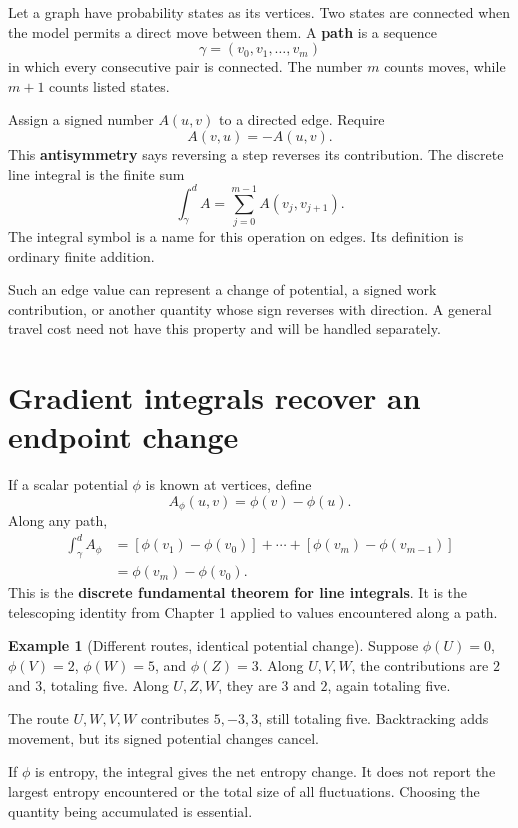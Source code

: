 \documentclass[11pt,oneside,openany]{book}
\theoremstyle{definition}
\newtheorem{example}{Example}[chapter]
\theoremstyle{remark}
\numberwithin{equation}{chapter}
\begin{document}
Let a graph have probability states as its vertices. Two states are connected when the model permits a direct move between them. A \textbf{path} is a sequence \[\gamma=(v_0,v_1,\ldots,v_m)\] in which every consecutive pair is connected. The number \(m\) counts moves, while \(m+1\) counts listed states.

Assign a signed number \(A(u,v)\) to a directed edge. Require \[A(v,u)=-A(u,v).\] This \textbf{antisymmetry} says reversing a step reverses its contribution. The discrete line integral is the finite sum \[\boxed{\int_\gamma^d A=\sum_{j=0}^{m-1}A(v_j,v_{j+1}).}\] The integral symbol is a name for this operation on edges. Its definition is ordinary finite addition.

Such an edge value can represent a change of potential, a signed work contribution, or another quantity whose sign reverses with direction. A general travel cost need not have this property and will be handled separately.

\section{Gradient integrals recover an endpoint change}\label{ch08-gradient-integrals-recover-an-endpoint-change}

If a scalar potential \(\phi\) is known at vertices, define \[A_\phi(u,v)=\phi(v)-\phi(u).\] Along any path, \[\begin{aligned}
\int_\gamma^d A_\phi
&=[\phi(v_1)-\phi(v_0)]+\cdots+[\phi(v_m)-\phi(v_{m-1})]\\
&=\phi(v_m)-\phi(v_0).
\end{aligned}\] This is the \textbf{discrete fundamental theorem for line integrals}. It is the telescoping identity from Chapter 1 applied to values encountered along a path.

\begin{example}[Different routes, identical potential change]

Suppose \(\phi(U)=0\), \(\phi(V)=2\), \(\phi(W)=5\), and \(\phi(Z)=3\). Along \(U,V,W\), the contributions are \(2\) and \(3\), totaling five. Along \(U,Z,W\), they are \(3\) and \(2\), again totaling five.

The route \(U,W,V,W\) contributes \(5,-3,3\), still totaling five. Backtracking adds movement, but its signed potential changes cancel.

\end{example}

If \(\phi\) is entropy, the integral gives the net entropy change. It does not report the largest entropy encountered or the total size of all fluctuations. Choosing the quantity being accumulated is essential.
\end{document}
